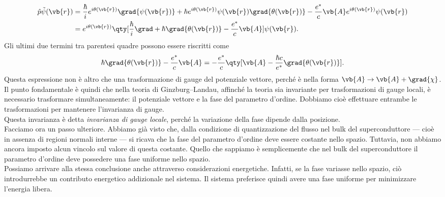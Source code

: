 \begin{equation*}
   \begin{split}
      \hat{p}\tilde{\psi}(\vb{r})
      &=
      \frac{\hbar}{i}
      e^{i\theta(\vb{r})}
      \grad{\psi(\vb{r})}
      +
      \hbar
      e^{i\theta(\vb{r})}
      \psi(\vb{r})
      \grad{\theta(\vb{r})}
      -
      \frac{e^*}{c}
      \vb{A}
      e^{i\theta(\vb{r})}
      \psi(\vb{r})
      \\
      &=
      e^{i\theta(\vb{r})}
      \qty[
      \frac{\hbar}{i}\grad
      +
      \hbar\grad{\theta(\vb{r})}
      -
      \frac{e^*}{c}\vb{A}
      ]
      \psi(\vb{r}).
   \end{split}
\end{equation*}
Gli ultimi due termini tra parentesi quadre possono essere riscritti come
\begin{equation*}
   \hbar\grad{\theta(\vb{r})}
   -
   \frac{e^*}{c}\vb{A}
   =
   -
   \frac{e^*}{c}
   \qty[
      \vb{A}
      -
      \frac{\hbar c}{e^*}
      \grad{\theta(\vb{r})}
   ].
\end{equation*}
Questa espressione non è altro che una trasformazione di gauge del potenziale vettore, perché è nella forma $\vb{A} \to \vb{A} + \grad{\chi}$.\\
Il punto fondamentale è quindi che nella teoria di Ginzburg--Landau, affinché la teoria sia invariante per trasformazioni di gauge locali, è necessario trasformare simultaneamente: il potenziale vettore e la fase del parametro d'ordine. Dobbiamo cioè effettuare entrambe le trasformazioni per mantenere l'invarianza di gauge.\\
Questa invarianza è detta \emph{invarianza di gauge locale}, perché la variazione della fase dipende dalla posizione.\\
Facciamo ora un passo ulteriore. Abbiamo già visto che, dalla condizione di quantizzazione del flusso nel bulk del superconduttore — cioè in assenza di regioni normali interne — si ricava che la fase del parametro d'ordine deve essere costante nello spazio. Tuttavia, non abbiamo ancora imposto alcun vincolo sul valore di questa costante. Quello che sappiamo è semplicemente che nel bulk del superconduttore il parametro d'ordine deve possedere una fase uniforme nello spazio.\\
Possiamo arrivare alla stessa conclusione anche attraverso considerazioni energetiche. Infatti, se la fase variasse nello spazio, ciò introdurrebbe un contributo energetico addizionale nel sistema. Il sistema preferisce quindi avere una fase uniforme per minimizzare l'energia libera.\\
